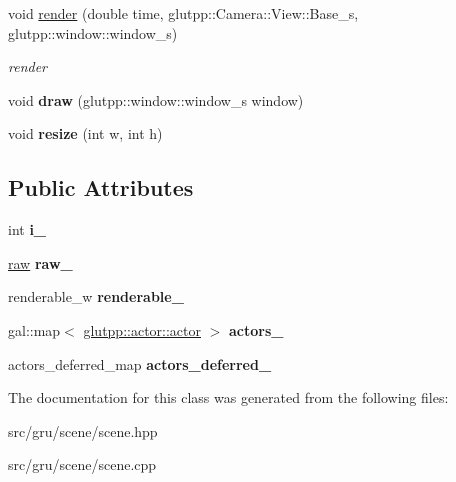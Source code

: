 \begin{DoxyCompactItemize}
\item 
\hypertarget{classglutpp_1_1scene_1_1scene_ab785a0fe5fbb72652a7e96d4ae9f5c4e}{void \hyperlink{classglutpp_1_1scene_1_1scene_ab785a0fe5fbb72652a7e96d4ae9f5c4e}{render} (double time, glutpp\-::\-Camera\-::\-View\-::\-Base\-\_\-s, glutpp\-::window\-::window\-\_\-s)}\label{classglutpp_1_1scene_1_1scene_ab785a0fe5fbb72652a7e96d4ae9f5c4e}

\begin{DoxyCompactList}\small\item\em render \end{DoxyCompactList}\item 
\hypertarget{classglutpp_1_1scene_1_1scene_a9bbb023db7322d1aed04f9ae5c541222}{void {\bfseries draw} (glutpp\-::window\-::window\-\_\-s window)}\label{classglutpp_1_1scene_1_1scene_a9bbb023db7322d1aed04f9ae5c541222}

\item 
\hypertarget{classglutpp_1_1scene_1_1scene_aff3b39ef52ea118f99a2e02e3ff819d9}{void {\bfseries resize} (int w, int h)}\label{classglutpp_1_1scene_1_1scene_aff3b39ef52ea118f99a2e02e3ff819d9}

\end{DoxyCompactItemize}
\subsection*{\-Public \-Attributes}
\begin{DoxyCompactItemize}
\item 
\hypertarget{classglutpp_1_1scene_1_1scene_a928bc6e75e5521c28ccdd48f6b54da80}{int {\bfseries i\-\_\-}}\label{classglutpp_1_1scene_1_1scene_a928bc6e75e5521c28ccdd48f6b54da80}

\item 
\hypertarget{classglutpp_1_1scene_1_1scene_af6e1bc3b0f6139a204bda6f1084cf14e}{\hyperlink{classglutpp_1_1scene_1_1raw}{raw} {\bfseries raw\-\_\-}}\label{classglutpp_1_1scene_1_1scene_af6e1bc3b0f6139a204bda6f1084cf14e}

\item 
\hypertarget{classglutpp_1_1scene_1_1scene_ae7cb4b325dcdf8a43307927db29d8dcc}{renderable\-\_\-w {\bfseries renderable\-\_\-}}\label{classglutpp_1_1scene_1_1scene_ae7cb4b325dcdf8a43307927db29d8dcc}

\item 
\hypertarget{classglutpp_1_1scene_1_1scene_af54deb6f8bbc4044640249810d90579c}{gal\-::map$<$ \hyperlink{classglutpp_1_1actor_1_1actor}{glutpp\-::actor\-::actor} $>$ {\bfseries actors\-\_\-}}\label{classglutpp_1_1scene_1_1scene_af54deb6f8bbc4044640249810d90579c}

\item 
\hypertarget{classglutpp_1_1scene_1_1scene_a311bc04b84484ff34e30a52350f011d8}{actors\-\_\-deferred\-\_\-map {\bfseries actors\-\_\-deferred\-\_\-}}\label{classglutpp_1_1scene_1_1scene_a311bc04b84484ff34e30a52350f011d8}

\end{DoxyCompactItemize}


\-The documentation for this class was generated from the following files\-:\begin{DoxyCompactItemize}
\item 
src/gru/scene/scene.\-hpp\item 
src/gru/scene/scene.\-cpp\end{DoxyCompactItemize}
